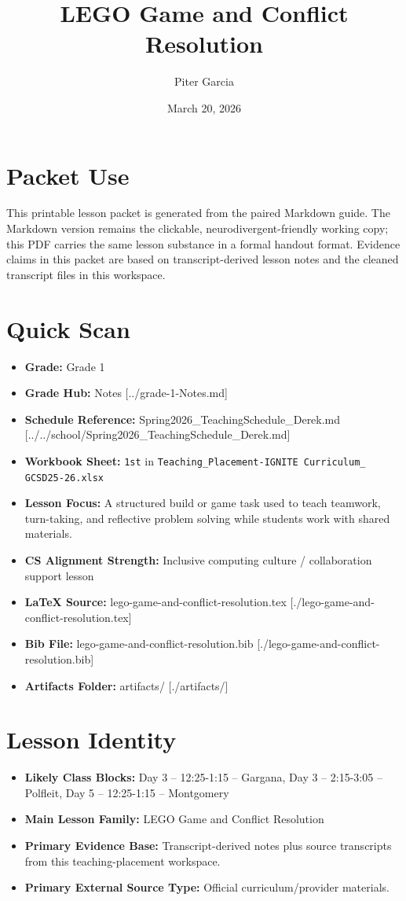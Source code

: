 \documentclass[11pt]{article}
\title{LEGO Game and Conflict Resolution}
\author{Piter Garcia}
\date{March 20, 2026}
\begin{document}
\maketitle
\section*{Packet Use}
This printable lesson packet is generated from the paired Markdown guide. The Markdown version remains the clickable, neurodivergent-friendly working copy; this PDF carries the same lesson substance in a formal handout format. Evidence claims in this packet are based on transcript-derived lesson notes and the cleaned transcript files in this workspace.

\section*{Quick Scan}
\begin{itemize}[leftmargin=*]
\item \textbf{Grade:} Grade 1
\item \textbf{Grade Hub:} Notes [../grade-1-Notes.md]
\item \textbf{Schedule Reference:} Spring2026\_TeachingSchedule\_Derek.md [../../school/Spring2026\_TeachingSchedule\_Derek.md]
\item \textbf{Workbook Sheet:} \texttt{1st} in \texttt{Teaching\_Placement-IGNITE Curriculum\_ GCSD25-26.xlsx}
\item \textbf{Lesson Focus:} A structured build or game task used to teach teamwork, turn-taking, and reflective problem solving while students work with shared materials.
\item \textbf{CS Alignment Strength:} Inclusive computing culture / collaboration support lesson
\item \textbf{LaTeX Source:} lego-game-and-conflict-resolution.tex [./lego-game-and-conflict-resolution.tex]
\item \textbf{Bib File:} lego-game-and-conflict-resolution.bib [./lego-game-and-conflict-resolution.bib]
\item \textbf{Artifacts Folder:} artifacts/ [./artifacts/]
\end{itemize}

\section*{Lesson Identity}
\begin{itemize}[leftmargin=*]
\item \textbf{Likely Class Blocks:} Day 3 -- 12:25-1:15 -- Gargana, Day 3 -- 2:15-3:05 -- Polfleit, Day 5 -- 12:25-1:15 -- Montgomery
\item \textbf{Main Lesson Family:} LEGO Game and Conflict Resolution
\item \textbf{Primary Evidence Base:} Transcript-derived notes plus source transcripts from this teaching-placement workspace.
\item \textbf{Primary External Source Type:} Official curriculum/provider materials.
\end{itemize}
\end{document}
